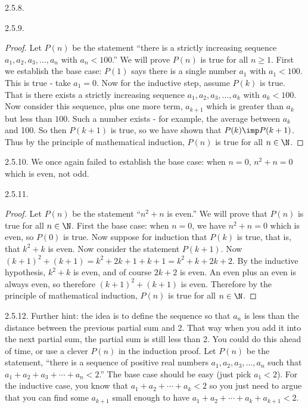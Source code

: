 \begin {itemize}
\begin{ans}{2.5.8.}
\end{ans}
\begin{ans}{2.5.9.}
		\begin{proof}
		 Let $P(n)$ be the statement ``there is a strictly increasing sequence $a_1, a_2, a_3, \ldots, a_n$ with $a_n < 100$.''  We will prove $P(n)$ is true for all $n \ge 1$. First we establish the base case: $P(1)$ says there is a single number $a_1$ with $a_1 < 100$.  This is true - take $a_1 = 0$.  Now for the inductive step, assume $P(k)$ is true.  That is there exists a strictly increasing sequence $a_1, a_2, a_3, \ldots, a_k$ with $a_k < 100$.  Now consider this sequence, plus one more term, $a_{k+1}$ which is greater than $a_k$ but less than $100$.  Such a number exists - for example, the average between $a_k$ and 100.  So then $P(k+1)$ is true, so we have shown that $P(k) \imp P(k+1)$.  Thus by the principle of mathematical induction, $P(n)$ is true for all $n \in \N$.
		\end{proof}

	
\end{ans}
\begin{ans}{2.5.10.}
  		We once again failed to establish the base case: when $n = 0$, $n^2 + n = 0$ which is even, not odd.
  	
\end{ans}
\begin{ans}{2.5.11.}
		  \begin{proof}
		    Let $P(n)$ be the statement ``$n^2 + n$ is even.''  We will prove that $P(n)$ is true for all $n \in \N$.  First the base case: when $n = 0$, we have $n^2 + n = 0$ which is even, so $P(0)$ is true.  Now suppose for induction that $P(k)$ is true, that is, that $k^2 + k$ is even.  Now consider the statement $P(k+1)$.  Now $(k+1)^2 + (k+1) = k^2 + 2k + 1 + k + 1 = k^2 + k + 2k + 2$.  By the inductive hypothesis, $k^2 + k$ is even, and of course $2k + 2$ is even.  An even plus an even is always even, so therefore $(k+1)^2 + (k+1)$ is even.  Therefore by the principle of mathematical induction, $P(n)$ is true for all $n \in \N$.
		  \end{proof}
	
\end{ans}
\begin{ans}{2.5.12.}
		 Further hint: the idea is to define the sequence so that $a_n$ is less than the distance between the previous partial sum and 2.  That way when you add it into the next partial sum, the partial sum is still less than 2.  You could do this ahead of time, or use a clever $P(n)$ in the induction proof.  Let $P(n)$ be the statement, ``there is a sequence of positive real numbers $a_1, a_2, a_3, \ldots, a_n$ such that $a_1 + a_2 + a_3 + \cdots + a_n < 2$.''  The base case should be easy (just pick $a_1 < 2$).  For the inductive case, you know that $a_1 + a_2 + \cdots + a_k < 2$ so you just need to argue that you can find some $a_{k+1}$ small enough to have $a_1 + a_2 + \cdots +a_k + a_{k+1} < 2$.
	

\end{ans}
\end{itemize}
